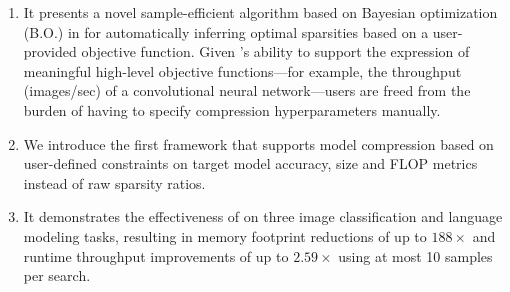 \begin{enumerate}
\item It presents a novel sample-efficient algorithm based on Bayesian optimization (B.O.) in \algoName for automatically inferring optimal sparsities based on a user-provided objective function. Given \algoName's ability to support the expression of meaningful high-level
objective functions---for example, the throughput (images/sec) of a convolutional neural network---users
are freed from the burden of having to specify compression hyperparameters manually.

\item We introduce the first framework that supports model compression based on user-defined constraints on target model accuracy, size and FLOP metrics instead of raw sparsity ratios.

\item It demonstrates the effectiveness of \algoName on three image classification and language modeling tasks, resulting in memory footprint reductions of up to $188\times$ and runtime throughput improvements of up to $2.59\times$ using at most 10 samples per search.
\end{enumerate}